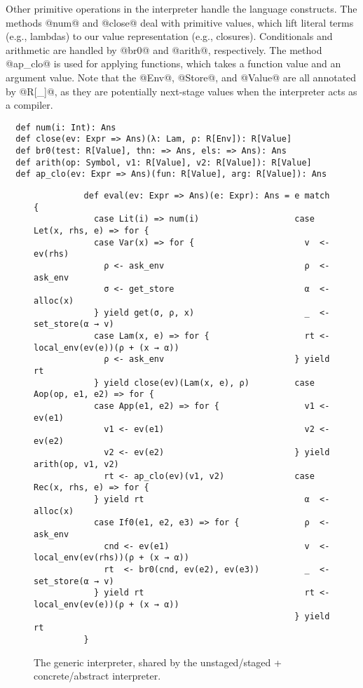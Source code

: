 Other primitive operations in the interpreter handle the language constructs.  The
methods @num@ and @close@ deal with primitive values, which lift literal terms
(e.g., lambdas) to our value representation (e.g., closures).
Conditionals and arithmetic are handled by @br0@ and @arith@, respectively. The
method @ap_clo@ is used for applying functions, which takes a function value
and an argument value. Note that the @Env@, @Store@, and @Value@ are all
annotated by @R[_]@, as they are potentially next-stage values when the
interpreter acts as a compiler.
\begin{lstlisting}
  def num(i: Int): Ans
  def close(ev: Expr => Ans)(λ: Lam, ρ: R[Env]): R[Value]
  def br0(test: R[Value], thn: => Ans, els: => Ans): Ans
  def arith(op: Symbol, v1: R[Value], v2: R[Value]): R[Value]
  def ap_clo(ev: Expr => Ans)(fun: R[Value], arg: R[Value]): Ans
\end{lstlisting}

\begin{figure}[t]
  \centering
  \begin{lstlisting}
          def eval(ev: Expr => Ans)(e: Expr): Ans = e match {
            case Lit(i) => num(i)                   case Let(x, rhs, e) => for {
            case Var(x) => for {                      v  <- ev(rhs)
              ρ <- ask_env                            ρ  <- ask_env
              σ <- get_store                          α  <- alloc(x)
            } yield get(σ, ρ, x)                      _  <- set_store(α → v)
            case Lam(x, e) => for {                   rt <- local_env(ev(e))(ρ + (x → α))
              ρ <- ask_env                          } yield rt
            } yield close(ev)(Lam(x, e), ρ)         case Aop(op, e1, e2) => for {
            case App(e1, e2) => for {                 v1 <- ev(e1)
              v1 <- ev(e1)                            v2 <- ev(e2)
              v2 <- ev(e2)                          } yield arith(op, v1, v2)
              rt <- ap_clo(ev)(v1, v2)              case Rec(x, rhs, e) => for {
            } yield rt                                α  <- alloc(x)
            case If0(e1, e2, e3) => for {             ρ  <- ask_env
              cnd <- ev(e1)                           v  <- local_env(ev(rhs))(ρ + (x → α))
              rt  <- br0(cnd, ev(e2), ev(e3))         _  <- set_store(α → v)
            } yield rt                                rt <- local_env(ev(e))(ρ + (x → α))
                                                    } yield rt
          }
  \end{lstlisting}
\vspace{-0.5em}
\caption{The generic interpreter,
  shared by the unstaged/staged + concrete/abstract interpreter.}
\vspace{-1.5em}
\label{fig:shared_int}
\end{figure}


